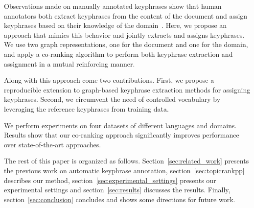   
  Observations made on manually annotated keyphrases show that human annotators both extract keyphrases from the content of the document and
  assign keyphrases based on their knowledge of the domain~\cite{liu2011vocabularygap}. Here, we
  propose an approach that mimics this behavior and jointly extracts and assigns keyphrases.
  We use two graph representations, one for the document and one for the domain, and apply a co-ranking algorithm to perform both keyphrase extraction and assignment in a mutual reinforcing manner.
  
  Along with this approach come two contributions.
  First, we propose a reproducible extension to graph-based keyphrase
  extraction methods for assigning keyphrases. Second, we circumvent the need of controlled vocabulary by leveraging the reference keyphrases from training
  data.
%

  We perform experiments on four datasets of different languages and domains.
  Results show that our co-ranking approach significantly improves performance over state-of-the-art approaches.

  The rest of this paper is organized as follows. Section~\ref{sec:related_work}
  presents the previous work on automatic keyphrase annotation,
  section~\ref{sec:topicrankpp} describes our method,
  section~\ref{sec:experimental_settings} presents our experimental settings and
  section~\ref{sec:results} discusses the results.
  Finally, section~\ref{sec:conclusion} concludes and shows some directions 
  for future work.
